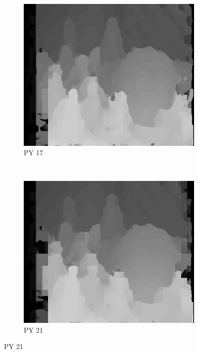 \begin{figure}
\begin{subfigure}[b]{0.23\textwidth}
    \centering
    \includegraphics[width=\textwidth]{images/stereo-pairs/cones_pyramid_17.png}
    \caption{PY 17}
  \end{subfigure}
  ~
  \begin{subfigure}[b]{0.23\textwidth}
    \centering
    \includegraphics[width=\textwidth]{images/stereo-pairs/cones_pyramid_21.png}
    \caption{PY 21}
  \end{subfigure}



\end{figure}
